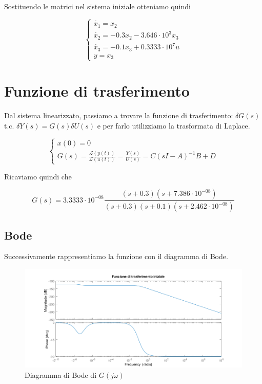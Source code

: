 \documentclass{article}
\begin{document}
Sostituendo le matrici nel sistema iniziale otteniamo quindi
\begin{large}
\[
\begin{cases}
\dot{x_1}=x_2\\
\dot{x_2}=-0.3x_2-3.646\cdot10^3 x_3\\
\dot{x_3}=-0.1 x_3+0.3333\cdot10^7 u\\
y=x_3
\end{cases}
\]
\end{large}

\section{Funzione di trasferimento}
Dal sistema linearizzato, passiamo a trovare la funzione di trasferimento: $\delta G(s)$ t.c. $\delta{Y} (s) = G(s)\delta{U} (s)$ e per farlo utilizziamo la trasformata di Laplace.

\begin{large}
\[
\begin{cases}
x(0)=0 \\
G(s)=\frac{\mathcal{L}(y(t))}{\mathcal{L}(u(t))}=\frac{Y(s)}{U(s)}=C(sI-A)^{-1} B +D
\end{cases}
\]
\end{large}

Ricaviamo quindi che
\begin{large}
\[
G(s) = 3.3333\cdot 10^{-08}\frac{(s+0.3) (s+7.386\cdot 10^{-08})} {(s+0.3) (s+0.1) (s+2.462\cdot 10^{-08})}
\]
\end{large}



\subsection{Bode}

Successivamente rappresentiamo la funzione con il diagramma di Bode.

\begin{figure}[!h]
\centering
\includegraphics[width=1\textwidth]{grafici/fig1.png}
\caption{\label{fig:bode}Diagramma di Bode di $G(j\omega)$}
\end{figure}
\pagebreak
\end{document}
